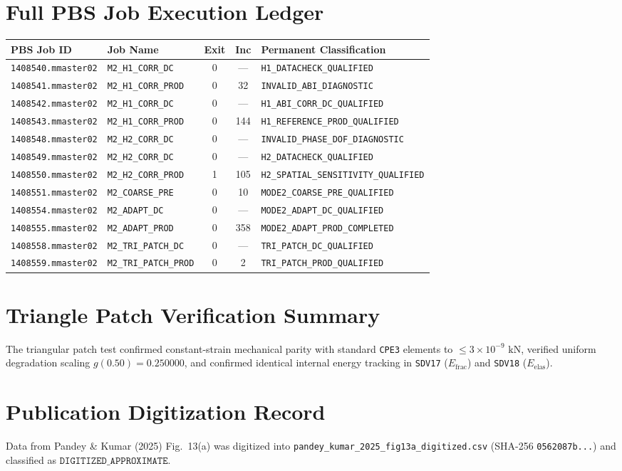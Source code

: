 \documentclass[11pt,a4paper]{article}
\begin{document}
\section{Full PBS Job Execution Ledger}
\begin{table}[htbp]
\centering
\small
\begin{tabularx}{\textwidth}{p{3.2cm}p{3.2cm}ccX}
\toprule
\textbf{PBS Job ID} & \textbf{Job Name} & \textbf{Exit} & \textbf{Inc} & \textbf{Permanent Classification} \\
\midrule
\texttt{1408540.mmaster02} & \texttt{M2\_H1\_CORR\_DC} & 0 & --- & \texttt{H1\_DATACHECK\_QUALIFIED} \\
\texttt{1408541.mmaster02} & \texttt{M2\_H1\_CORR\_PROD} & 0 & 32 & \texttt{INVALID\_ABI\_DIAGNOSTIC} \\
\texttt{1408542.mmaster02} & \texttt{M2\_H1\_CORR\_DC} & 0 & --- & \texttt{H1\_ABI\_CORR\_DC\_QUALIFIED} \\
\texttt{1408543.mmaster02} & \texttt{M2\_H1\_CORR\_PROD} & 0 & 144 & \texttt{H1\_REFERENCE\_PROD\_QUALIFIED} \\
\texttt{1408548.mmaster02} & \texttt{M2\_H2\_CORR\_DC} & 0 & --- & \texttt{INVALID\_PHASE\_DOF\_DIAGNOSTIC} \\
\texttt{1408549.mmaster02} & \texttt{M2\_H2\_CORR\_DC} & 0 & --- & \texttt{H2\_DATACHECK\_QUALIFIED} \\
\texttt{1408550.mmaster02} & \texttt{M2\_H2\_CORR\_PROD} & 1 & 105 & \texttt{H2\_SPATIAL\_SENSITIVITY\_QUALIFIED} \\
\texttt{1408551.mmaster02} & \texttt{M2\_COARSE\_PRE} & 0 & 10 & \texttt{MODE2\_COARSE\_PRE\_QUALIFIED} \\
\texttt{1408554.mmaster02} & \texttt{M2\_ADAPT\_DC} & 0 & --- & \texttt{MODE2\_ADAPT\_DC\_QUALIFIED} \\
\texttt{1408555.mmaster02} & \texttt{M2\_ADAPT\_PROD} & 0 & 358 & \texttt{MODE2\_ADAPT\_PROD\_COMPLETED} \\
\texttt{1408558.mmaster02} & \texttt{M2\_TRI\_PATCH\_DC} & 0 & --- & \texttt{TRI\_PATCH\_DC\_QUALIFIED} \\
\texttt{1408559.mmaster02} & \texttt{M2\_TRI\_PATCH\_PROD} & 0 & 2 & \texttt{TRI\_PATCH\_PROD\_QUALIFIED} \\
\bottomrule
\end{tabularx}
\end{table}

\section{Triangle Patch Verification Summary}
The triangular patch test confirmed constant-strain mechanical parity with standard \texttt{CPE3} elements to $\le 3\times 10^{-9}\text{ kN}$, verified uniform degradation scaling $g(0.50) = 0.250000$, and confirmed identical internal energy tracking in \texttt{SDV17} ($E_{\mathrm{frac}}$) and \texttt{SDV18} ($E_{\mathrm{elas}}$).

\section{Publication Digitization Record}
Data from Pandey \& Kumar (2025) Fig.~13(a) was digitized into \texttt{pandey\_kumar\_2025\_fig13a\_digitized.csv} (SHA-256 \texttt{0562087b...}) and classified as $\mathtt{DIGITIZED\_APPROXIMATE}$.
\end{document}
